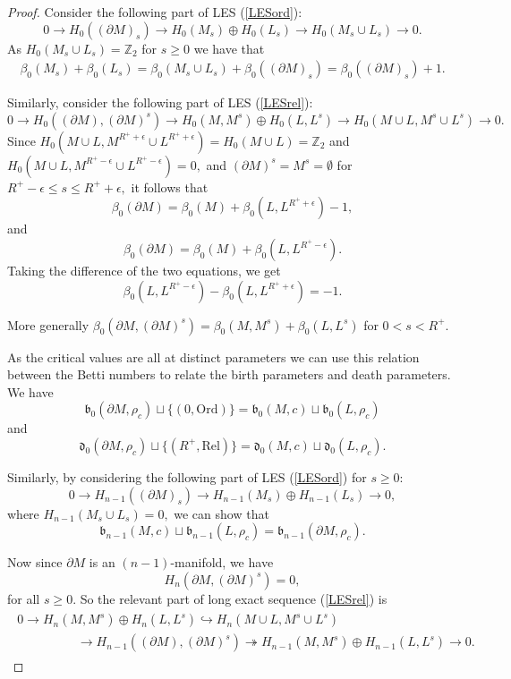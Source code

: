 \documentclass[10pt,a4paper]{amsart}
\newcommand{\Z}{\mathbb{Z}}
\begin{document}
\begin{proof}

Consider the following part of LES (\ref{LESord}):
$$0\to H_0((\partial M)_s)\to H_0(M_s)\oplus H_0(L_s) \to H_0(M_s\cup L_s)\to 0.$$ As $H_0(M_s\cup L_s) = \Z_2$ for $s\geq 0$ we have that 
\begin{align}\label{rel2}\beta_0(M_s)+\beta_0(L_s) = \beta_0(M_s\cup L_s) +\beta_0((\partial M)_s) = \beta_0((\partial M)_s) + 1.\end{align}

Similarly, consider the following part of LES (\ref{LESrel}):
$$0\to H_0((\partial M),(\partial M)^s)\to H_0(M,M^s)\oplus H_0(L,L^s) \to H_0(M\cup L,M^s\cup L^s)\to 0.$$
Since $H_0(M\cup L,M^{R^+ +\epsilon}\cup L^{R^+ +\epsilon}) = H_0(M\cup L) = \Z_2$ and $H_0(M\cup L,M^{R^+-\epsilon}\cup L^{R^+-\epsilon})  = 0,$ and $(\partial M)^s = M^s=\emptyset$ for $R^+ -\epsilon\leq s\leq R^+ +\epsilon,$ it follows that
$$\beta_0(\partial M)=\beta_0(M)+\beta_0(L,L^{R^+ +\epsilon})-1,$$ and 
$$\beta_0(\partial M)=\beta_0(M)+\beta_0(L,L^{R^+ -\epsilon}).$$ Taking the difference of the two equations, we get
$$\beta_0(L,L^{R^+ -\epsilon})-\beta_0(L,L^{R^+ +\epsilon})=-1.$$ 

More generally $\beta_0(\partial M, (\partial M)^s)=\beta_0(M, M^s)+\beta_0(L,L^{s})$ for $0<s<R^+$. 

As the critical values are all at distinct parameters we can use this relation between the Betti numbers to relate the birth parameters and death parameters.
We have $$\mathfrak{b}_0(\partial M,\rho_c)\sqcup \{(0,\text{Ord})\} = \mathfrak{b}_0(M,c)\sqcup \mathfrak{b}_0(L,\rho_c)$$ 
and 
$$\mathfrak{d}_0(\partial M,\rho_c)\sqcup \{(R^+,\text{Rel})\} = \mathfrak{d}_0(M,c)\sqcup \mathfrak{d}_0(L,\rho_c).$$ 

Similarly, by considering the following part of LES (\ref{LESord}) for $s\ge 0$:
$$0\to H_{n-1}((\partial M)_s)\to H_{n-1}(M_s)\oplus H_{n-1}(L_s) \to 0,$$ where $H_{n-1}(M_s\cup L_s) = 0,$ we can show that 
$$\mathfrak{b}_{n-1}(M,c)\sqcup  \mathfrak{b}_{n-1}(L,\rho_c)= \mathfrak{b}_{n-1}(\partial M,\rho_c).$$

Now since $\partial M$ is an $(n-1)$-manifold, we have 
$$H_n(\partial M,(\partial M)^s) = 0,$$ for all $s\ge 0$. So the relevant part of long exact sequence (\ref{LESrel}) is
\begin{align}\label{LESYAY3}
\begin{split}
   0 \overset{}{\longrightarrow} H_n(M,M^s)\oplus H_n(L,L^s)\hookrightarrow H_n(M\cup L,M^s\cup L^s) \hspace{3cm}\\
  \hspace{2cm} \longrightarrow H_{n-1}((\partial M), (\partial M)^s)
  \twoheadrightarrow H_{n-1}(M,M^s)\oplus H_{n-1}(L,L^s)\overset{}{\longrightarrow} 0.
\end{split}
\end{align} 


\end{proof}
\end{document}
